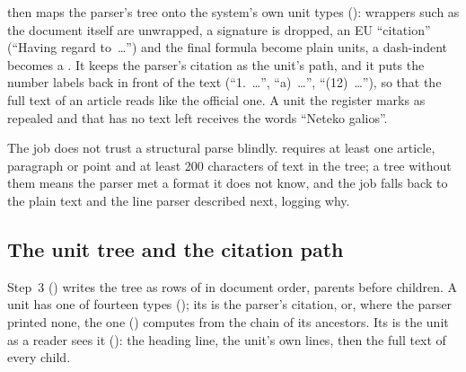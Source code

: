  then maps the parser's tree onto the system's own unit types
(): wrappers such as the document itself are unwrapped, a signature is dropped,
an EU \enquote{citation} (\enquote{Having regard to~…}) and the final formula become plain
 units, a dash-indent becomes a . It keeps the parser's citation as
the unit's path, and it puts the number labels back in front of the text
(\enquote{1.~…}, \enquote{a)~…}, \enquote{(12)~…}), so that the full text of an article reads
like the official one. A unit the register marks as repealed and that has no text left
receives the words \enquote{Neteko galios}.

The job does not trust a structural parse blindly.  requires at least
one article, paragraph or point and at least 200 characters of text in the tree; a tree
without them means the parser met a format it does not know, and the job falls back to the
plain text and the line parser described next, logging why.

\subsection{The unit tree and the citation path}\label{sec:corpus:tree}

Step~3 () writes the tree as rows of  in document order,
parents before children. A unit has one of fourteen types (); its
 is the parser's citation, or, where the parser printed none, the one
 () computes from the chain of its ancestors.
Its  is the unit as a reader sees it (): the heading
line, the unit's own lines, then the full text of every child.

